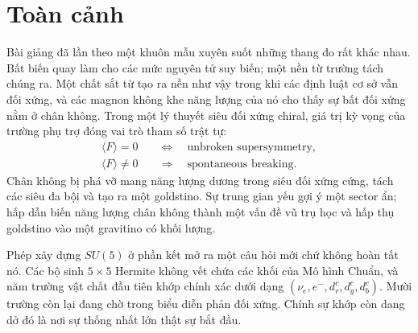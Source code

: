 \begin{classroomqa}
\end{classroomqa}

\section{Toàn cảnh}

Bài giảng đã lần theo một khuôn mẫu xuyên suốt những thang đo rất khác nhau. Bất biến quay làm cho các mức nguyên tử suy biến; một nền từ trường tách chúng ra. Một chất sắt từ tạo ra nền như vậy trong khi các định luật cơ sở vẫn đối xứng, và các magnon không khe năng lượng của nó cho thấy sự bất đối xứng nằm ở chân không. Trong một lý thuyết siêu đối xứng chiral, giá trị kỳ vọng của trường phụ trợ đóng vai trò tham số trật tự:
\begin{equation}
\begin{aligned}
\langle F\rangle=0
&\quad\Longleftrightarrow\quad
\text{unbroken supersymmetry},\\
\langle F\rangle\neq0
&\quad\Longrightarrow\quad
\text{spontaneous breaking}.
\end{aligned}
\end{equation}
Chân không bị phá vỡ mang năng lượng dương trong siêu đối xứng cứng, tách các siêu đa bội và tạo ra một goldstino. Sự trung gian yếu gợi ý một sector ẩn; hấp dẫn biến năng lượng chân không thành một vấn đề vũ trụ học và hấp thụ goldstino vào một gravitino có khối lượng.

Phép xây dựng \(SU(5)\) ở phần kết mở ra một câu hỏi mới chứ không hoàn tất nó. Các bộ sinh \(5\times5\) Hermite không vết chứa các khối của Mô hình Chuẩn, và năm trường vật chất đầu tiên khớp chính xác dưới dạng \((\nu_e,e^-,d^c_r,d^c_g,d^c_b)\). Mười trường còn lại đang chờ trong biểu diễn phản đối xứng. Chính sự khớp còn dang dở đó là nơi sự thống nhất lớn thật sự bắt đầu.
